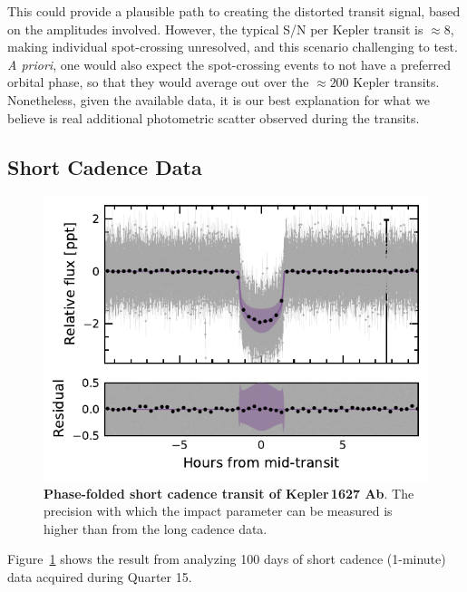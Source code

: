 \documentclass[12pt,modern,twocolumn,tighten]{aastex63}
\begin{document}
This could provide a plausible path to creating the distorted transit
signal, based on the amplitudes involved.  However, the typical S/N
per Kepler transit is $\approx8$, making individual spot-crossing
unresolved, and this scenario challenging to test.  {\it A priori},
one would also expect the spot-crossing events to not have a preferred
orbital phase, so that they would average out over the $\approx200$
Kepler transits.  Nonetheless, given the available data, it is our
best explanation for what we believe is real additional photometric
scatter observed during the transits.

\subsection{Short Cadence Data}

\begin{figure}[t]
	\begin{center}
		\leavevmode
		\includegraphics[width=1\textwidth]{f12.pdf}
	\end{center}
	\vspace{-0.7cm}
	\caption{
		{\bf Phase-folded short cadence transit of Kepler\,1627 Ab}.  
    The precision with which the impact parameter can be measured is
    higher than from the long cadence data.
		\label{fig:phase_slc}
	}
\end{figure}

Figure~\ref{fig:phase_slc} shows the result from analyzing 100 days of
short cadence (1-minute) data acquired during Quarter 15.
\end{document}
